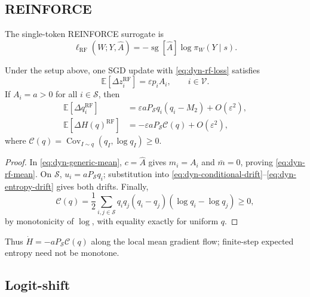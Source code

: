 \subsection{REINFORCE}
\label{app:dynamics-reinforce}

The single-token REINFORCE surrogate \citep{williams_simple_1992} is
\begin{equation}
 \ell_{\mathrm{RF}}(W;Y,\widehat A)
 =-\operatorname{sg}[\widehat A]\log\pi_W(Y\mid s).
 \label{eq:dyn-rf-loss}
\end{equation}

\begin{lemma}
\label{lem:dyn-reinforce}
Under the setup above, one SGD update with
\eqref{eq:dyn-rf-loss} satisfies
\begin{equation}
 \mathbb E[\Delta z_i^{\mathrm{RF}}]
 =\varepsilon p_iA_i,\qquad i\in\mathcal V.
 \label{eq:dyn-rf-mean}
\end{equation}
If $A_i=a>0$ for all $i\in\mathcal S$, then
\begin{align}
 \mathbb E[\Delta q_i^{\mathrm{RF}}]
 &=\varepsilon aP_{\mathcal S}q_i(q_i-M_2)+O(\varepsilon^2),
 \label{eq:dyn-rf-q}\\
 \mathbb E[\Delta H(q)^{\mathrm{RF}}]
 &=-\varepsilon aP_{\mathcal S}\mathcal C(q)+O(\varepsilon^2),
 \label{eq:dyn-rf-h}
\end{align}
where $\mathcal C(q)=\operatorname{Cov}_{I\sim q}(q_I,\log q_I)\ge0$.
\end{lemma}

\begin{proof}
In \eqref{eq:dyn-generic-mean}, $c=\widehat A$ gives $m_i=A_i$ and
$\bar m=0$, proving \eqref{eq:dyn-rf-mean}. On $\mathcal S$,
$u_i=aP_{\mathcal S}q_i$; substitution into
\eqref{eq:dyn-conditional-drift}--\ref{eq:dyn-entropy-drift} gives both
drifts. Finally,
\begin{equation}
 \mathcal C(q)=\frac12\sum_{i,j\in\mathcal S}
 q_iq_j(q_i-q_j)(\log q_i-\log q_j)\ge0,
 \label{eq:dyn-covariance-sign}
\end{equation}
by monotonicity of $\log$, with equality exactly for uniform $q$.
\end{proof}

Thus $\dot H=-aP_{\mathcal S}\mathcal C(q)$ along the local mean gradient
flow; finite-step expected entropy need not be monotone.

\subsection{Logit-shift}
\label{app:dynamics-logit-shift}

